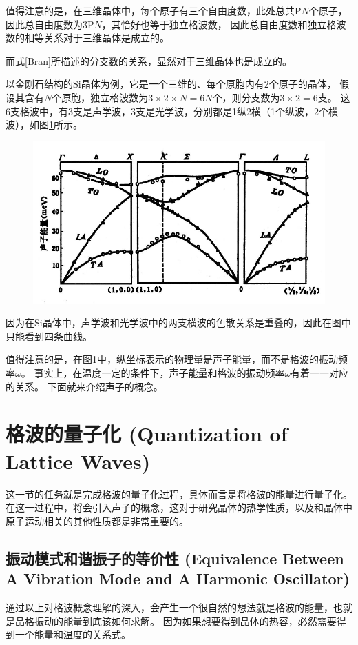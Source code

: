 \documentclass[declarePage]{ecnuthesis}
\begin{document}
值得注意的是，在三维晶体中，每个原子有三个自由度数，此处总共P$N$个原子，因此总自由度数为3P$N$，其恰好也等于独立格波数，%
因此总自由度数和独立格波数的相等关系对于三维晶体是成立的。

而式\ref{Bran}所描述的分支数的关系，显然对于三维晶体也是成立的。

以金刚石结构的Si晶体为例，它是一个三维的、每个原胞内有2个原子的晶体，%
假设其含有$N$个原胞，独立格波数为$3 \times 2  \times N= 6N$个，则分支数为$3 \times 2 = 6$支。%
这6支格波中，有3支是声学波，3支是光学波，分别都是1纵2横（1个纵波，2个横波），如图\ref{Si}所示。
\begin{figure}[htb]
    \centering
    \includegraphics[width=.7\textwidth]{Si.png}
     \label{Si}
\end{figure}

因为在Si晶体中，声学波和光学波中的两支横波的色散关系是重叠的，因此在图中只能看到四条曲线。

值得注意的是，在图\ref{Si}中，纵坐标表示的物理量是声子能量，而不是格波的振动频率$ω$。%
事实上，在温度一定的条件下，声子能量和格波的振动频率$ω$有着一一对应的关系。%
下面就来介绍声子的概念。

\section{格波的量子化 (Quantization of Lattice Waves)}

这一节的任务就是完成格波的量子化过程，具体而言是将格波的能量进行量子化。%
在这一过程中，将会引入声子的概念，这对于研究晶体的热学性质，以及和晶体中原子运动相关的其他性质都是非常重要的。

\subsection{振动模式和谐振子的等价性 (Equivalence Between A Vibration Mode and A Harmonic Oscillator)}

通过以上对格波概念理解的深入，会产生一个很自然的想法就是格波的能量，也就是晶格振动的能量到底该如何求解。%
因为如果想要得到晶体的热容，必然需要得到一个能量和温度的关系式。
\end{document}
